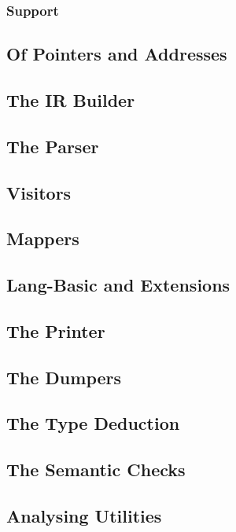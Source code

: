 \subsubsection{Support}

\subsection{Of Pointers and Addresses}
\label{sec:Compiler.Core.PointersAndAddresses}

\subsection{The IR Builder}
\label{sec:Compiler.Core.Builder}
\subsection{The Parser}
\label{sec:Compiler.Core.Parser}
\subsection{Visitors}
\label{sec:Compiler.Core.Visitors}
\subsection{Mappers}
\label{sec:Compiler.Core.Mappers}
\subsection{Lang-Basic and Extensions}
\label{sec:Compiler.Core.LangBasic}
\subsection{The Printer}
\label{sec:Compiler.Core.Printer}
\subsection{The Dumpers}
\label{sec:Compiler.Core.Dumpers}
\subsection{The Type Deduction}
\label{sec:Compiler.Core.TypeDeduction}
\subsection{The Semantic Checks}
\label{sec:Compiler.Core.SemanticChecks}
\subsection{Analysing Utilities}
\label{sec:Compiler.Core.Analysis}
